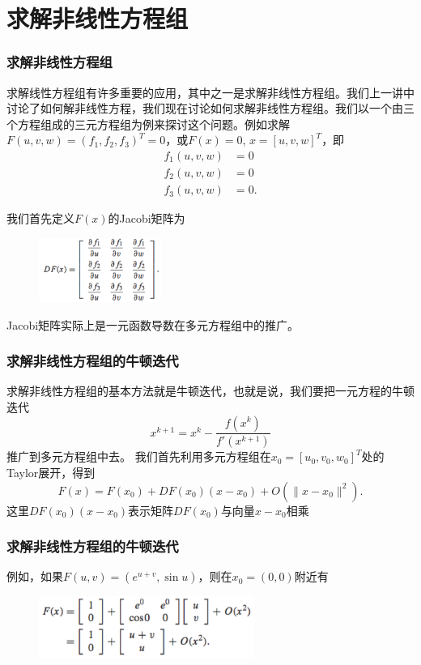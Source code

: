 \documentclass[10pt]{beamer}
\begin{document}



\section{求解非线性方程组}

\begin{frame}
\frametitle{求解非线性方程组}
求解线性方程组有许多重要的应用，其中之一是求解非线性方程组。我们上一讲中讨论了如何解非线性方程，我们现在讨论如何求解非线性方程组。我们以一个由三个方程组成的三元方程组为例来探讨这个问题。例如求解$F(u,v, w) = (f_1, f_2, f_3)^T = 0$，或$F(x) = 0$, $x = [u,v,w]^T$，即
\begin{align}
\label{eq: nonlinear system 3 variable general}
f_1(u,v,w) &= 0 \nonumber \\
f_2(u,v,w) &= 0 \nonumber \\
f_3(u,v,w) &= 0.
\end{align}

我们首先定义$F(x)$的Jacobi矩阵为
\begin{figure}
\includegraphics[width=4cm]{figs/2_6_Nonlinear-General-1} 
\end{figure}
Jacobi矩阵实际上是一元函数导数在多元方程组中的推广。
\end{frame}


\begin{frame}
\frametitle{求解非线性方程组的牛顿迭代}
求解非线性方程组的基本方法就是牛顿迭代，也就是说，我们要把一元方程的牛顿迭代
\begin{equation}
x^{k+1} = x^{k}  - \frac{f(x^k)}{f'(x^{k+1})}
\end{equation}
推广到多元方程组中去。
我们首先利用多元方程组在$x_0 = [u_0, v_0, w_0]^T$处的Taylor展开，得到
\begin{equation}
F(x) = F(x_0) + DF(x_0) (x-x_0) + O(\|x-x_0\|^2).
\end{equation}
这里$DF(x_0) (x-x_0)$表示矩阵$DF(x_0)$与向量$x-x_0$相乘
\end{frame}


\begin{frame}
\frametitle{求解非线性方程组的牛顿迭代}
例如，如果$F(u,v) = (e^{u+v}, \sin u)$，则在$x_0 = (0,0)$附近有
\begin{figure}
\includegraphics[width=7cm]{figs/2_6_Nonlinear-General-2} 
\end{figure}
\end{frame}
\end{document}
